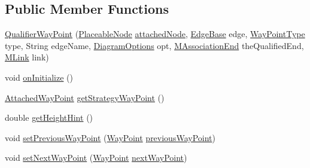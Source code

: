 \subsection*{Public Member Functions}
\begin{DoxyCompactItemize}
\item 
\hyperlink{classorg_1_1tzi_1_1use_1_1gui_1_1views_1_1diagrams_1_1waypoints_1_1_qualifier_way_point_a2129883081564e181766f368e83c8e8b}{Qualifier\-Way\-Point} (\hyperlink{classorg_1_1tzi_1_1use_1_1gui_1_1views_1_1diagrams_1_1elements_1_1_placeable_node}{Placeable\-Node} \hyperlink{classorg_1_1tzi_1_1use_1_1gui_1_1views_1_1diagrams_1_1waypoints_1_1_attached_way_point_a4afc81c0c6490c31b7eb211e8521fb0a}{attached\-Node}, \hyperlink{classorg_1_1tzi_1_1use_1_1gui_1_1views_1_1diagrams_1_1elements_1_1edges_1_1_edge_base}{Edge\-Base} edge, \hyperlink{enumorg_1_1tzi_1_1use_1_1gui_1_1views_1_1diagrams_1_1waypoints_1_1_way_point_type}{Way\-Point\-Type} type, String edge\-Name, \hyperlink{classorg_1_1tzi_1_1use_1_1gui_1_1views_1_1diagrams_1_1_diagram_options}{Diagram\-Options} opt, \hyperlink{classorg_1_1tzi_1_1use_1_1uml_1_1mm_1_1_m_association_end}{M\-Association\-End} the\-Qualified\-End, \hyperlink{interfaceorg_1_1tzi_1_1use_1_1uml_1_1sys_1_1_m_link}{M\-Link} link)
\item 
void \hyperlink{classorg_1_1tzi_1_1use_1_1gui_1_1views_1_1diagrams_1_1waypoints_1_1_qualifier_way_point_a62573b7f48a3d039071a418e040b4b0a}{on\-Initialize} ()
\item 
\hyperlink{classorg_1_1tzi_1_1use_1_1gui_1_1views_1_1diagrams_1_1waypoints_1_1_attached_way_point}{Attached\-Way\-Point} \hyperlink{classorg_1_1tzi_1_1use_1_1gui_1_1views_1_1diagrams_1_1waypoints_1_1_qualifier_way_point_a90d1dd0c6b9f853a70036e0cdaf4e98c}{get\-Strategy\-Way\-Point} ()
\item 
double \hyperlink{classorg_1_1tzi_1_1use_1_1gui_1_1views_1_1diagrams_1_1waypoints_1_1_qualifier_way_point_ab1ce4ff984e0a2f74556bcbf522eee0b}{get\-Height\-Hint} ()
\item 
void \hyperlink{classorg_1_1tzi_1_1use_1_1gui_1_1views_1_1diagrams_1_1waypoints_1_1_qualifier_way_point_a1e83c8075b67365b445ec65fcb1f785a}{set\-Previous\-Way\-Point} (\hyperlink{classorg_1_1tzi_1_1use_1_1gui_1_1views_1_1diagrams_1_1waypoints_1_1_way_point}{Way\-Point} \hyperlink{classorg_1_1tzi_1_1use_1_1gui_1_1views_1_1diagrams_1_1waypoints_1_1_way_point_acfbb3ccd53ce4deaf5a8240d49367125}{previous\-Way\-Point})
\item 
void \hyperlink{classorg_1_1tzi_1_1use_1_1gui_1_1views_1_1diagrams_1_1waypoints_1_1_qualifier_way_point_a979a0b9d6a672391d275269105cadbaf}{set\-Next\-Way\-Point} (\hyperlink{classorg_1_1tzi_1_1use_1_1gui_1_1views_1_1diagrams_1_1waypoints_1_1_way_point}{Way\-Point} \hyperlink{classorg_1_1tzi_1_1use_1_1gui_1_1views_1_1diagrams_1_1waypoints_1_1_way_point_a474962722f712c8477509df9e9cf60fc}{next\-Way\-Point})

\end{DoxyCompactItemize}
